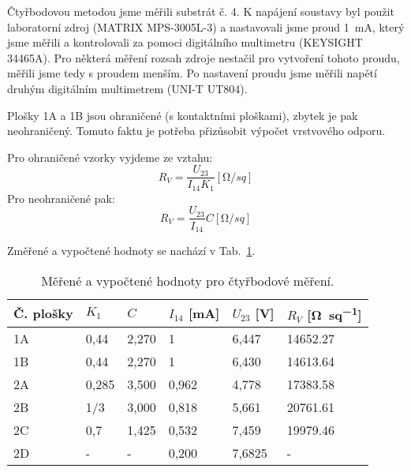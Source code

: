 Čtyřbodovou metodou jsme měřili substrát č. 4. K napájení soustavy byl použit laboratorní zdroj (MATRIX MPS-3005L-3) a nastavovali jsme proud \qty{1}{\milli\ampere}, který jsme měřili a kontrolovali za pomoci digitálního multimetru (KEYSIGHT 34465A). Pro některá měření rozsah zdroje nestačil pro vytvoření tohoto proudu, měřili jsme tedy s proudem menším. 
Po nastavení proudu jsme měřili napětí druhým digitálním multimetrem (UNI-T UT804).

Plošky 1A a 1B jsou ohraničené (s kontaktními ploškami), zbytek je pak neohraničený. Tomuto faktu je potřeba přizůsobit výpočet vrstvového odporu.

Pro ohraničené vzorky vyjdeme ze vztahu:
\[
    R_{V} = \frac{U_{23}}{I_{14} K_{1}} [\unit{\ohm\per sq}]
\]
Pro neohraničené pak:
\[
    R_{V} = \frac{U_{23}}{I_{14}}C [\unit{\ohm\per sq}]
\]

Změřené a vypočtené hodnoty se nachází v Tab.~\ref{tab:ctyrbod_hodnoty}. 

\begin{table}[h!]
    \caption{Měřené a vypočtené hodnoty pro čtyřbodové měření.}
    \centering
    \def\arraystretch{1.4}
    \begin{tabular}{l|l|l||l|l||l}
        Č. plošky & \(K_{1} \) & \(C\) & \(I_{14} \)  [mA] & \(U_{23} \)  [V] & \(R_{V} \)  [\unit{\ohm\per sq}] \\
        \hline \hline
        1A & 0,44  & 2,270  &  1 & 6,447 & \num{14652,27} \\           \hline
        1B & 0,44  & 2,270  &  1 & 6,430 & \num{14613,64} \\           \hline
        2A & 0,285 & 3,500  &  0,962 & 4,778 & \num{17383,58} \\       \hline
        2B & 1/3   & 3,000  &  0,818 & 5,661 & \num{20761,61} \\       \hline
        2C & 0,7   & 1,425  &  0,532 & 7,459 & \num{19979,46} \\       \hline
        2D & -     & -      &  0,200 & 7,6825 & - \\  
    \end{tabular}
    \label{tab:ctyrbod_hodnoty}
\end{table}










